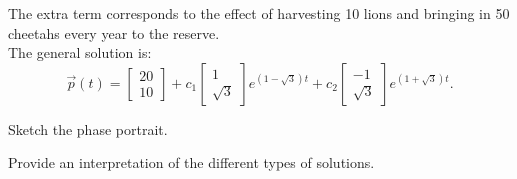 	The extra term corresponds to the effect of harvesting 10 lions and bringing in 50 cheetahs every year to the reserve. \\
	
	The general solution is:
	$$
	\vec{p}(t) = \begin{bmatrix} 20 \\ 10 \end{bmatrix} +
		c_1 \begin{bmatrix} 1 \\ \sqrt{3} \end{bmatrix} e^{(1-\sqrt{3})t} + c_2 \begin{bmatrix} -1 \\ \sqrt{3} \end{bmatrix} e^{(1+\sqrt{3})t}.
	$$
\begin{parts}
	\item Sketch the phase portrait.
	\item Provide an interpretation of the different types of solutions.
\end{parts}



\bookonlynewpage


